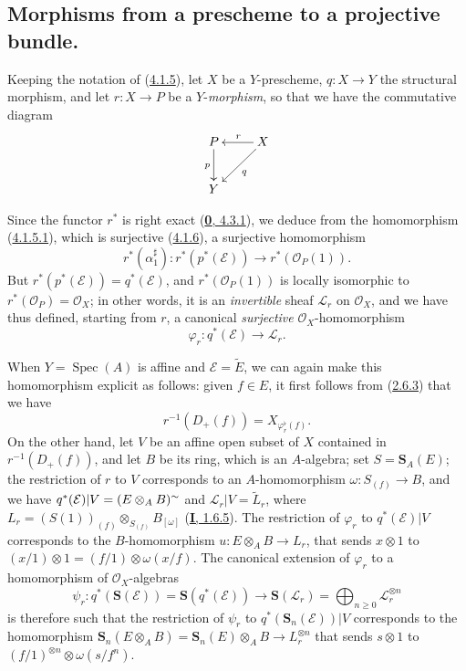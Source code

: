 \subsection{Morphisms from a prescheme to a projective bundle.}
\label{subsection:II.4.2}

\begin{env}[4.2.1]
\label{II.4.2.1}
Keeping the notation of (\hyperref[II.4.1.5]{4.1.5}), let $X$ be a
$Y$-prescheme, $q:X\to Y$ the structural morphism, and let $r:X\to P$ be a
$Y$-\emph{morphism}, so that we have the commutative diagram
\[
  \xymatrix{
    P \ar[d]_p & X \ar[l]_r \ar[dl]^q
    \\Y
  }
\]


Since the functor $r^*$ is right exact
(\hyperref[0.4.3.1]{\textbf{0}, 4.3.1}), we deduce from the homomorphism
(\hyperref[II.4.1.5.1]{4.1.5.1}), which is surjective
(\hyperref[II.4.1.6]{4.1.6}), a surjective homomorphism
\[
  r^*(\alpha_1^\sharp):r^*(p^*(\mathcal{E}))\longrightarrow
  r^*(\mathcal{O}_P(1)).
\]
But $r^*(p^*(\mathcal{E}))=q^*(\mathcal{E})$, and
$r^*(\mathcal{O}_P(1))$ is locally isomorphic to
$r^*(\mathcal{O}_P)=\mathcal{O}_X$; in other words, it is an \emph{invertible}
sheaf $\mathcal{L}_r$ on $\mathcal{O}_X$, and we have thus defined, starting
from $r$, a canonical \emph{surjective} $\mathcal{O}_X$-homomorphism
\[
\label{II.4.2.1.1}
  \varphi_r:q^*(\mathcal{E})\longrightarrow\mathcal{L}_r.
\tag{4.2.1.1}
\]

When $Y=\operatorname{Spec}(A)$ is affine and
$\mathcal{E}=\widetilde{E}$, we can again make this homomorphism explicit as
follows: given $f\in E$, it first follows from
(\hyperref[II.2.6.3]{2.6.3}) that we have
\[
\label{II.4.2.1.2}
  r^{-1}(D_+(f))=X_{\varphi_r^\flat(f)}.
\tag{4.2.1.2}
\]
On the other hand, let $V$ be an affine open subset of $X$ contained in
$r^{-1}(D_+(f))$, and let $B$ be its ring, which is an $A$-algebra; set
$S=\mathbf{S}_A(E)$; the restriction of $r$ to $V$ corresponds to an
$A$-homomorphism $\omega:S_{(f)}\to B$, and we have
$q^*(\mathcal{E})|V=(E\otimes_A B)^{\sim}$ and
$\mathcal{L}_r|V=\widetilde{L}_r$, where
$L_r=(S(1))_{(f)}\otimes_{S_{(f)}}B_{[\omega]}$
(\hyperref[I.1.6.5]{\textbf{I}, 1.6.5}). The restriction of $\varphi_r$ to
$q^*(\mathcal{E})|V$ corresponds to the $B$-homomorphism
$u:E\otimes_A B\to L_r$, that sends $x\otimes1$ to
$(x/1)\otimes1=(f/1)\otimes\omega(x/f)$. The canonical extension of
$\varphi_r$ to a homomorphism of $\mathcal{O}_X$-algebras
\[
  \psi_r:q^*(\mathbf{S}(\mathcal{E}))=
  \mathbf{S}(q^*(\mathcal{E}))\longrightarrow
  \mathbf{S}(\mathcal{L}_r)=\bigoplus_{n\geq0}\mathcal{L}_r^{\otimes n}
\]
is therefore such that the restriction of $\psi_r$ to
$q^*(\mathbf{S}_n(\mathcal{E}))|V$ corresponds to the homomorphism
$\mathbf{S}_n(E\otimes_A B)=\mathbf{S}_n(E)\otimes_A B\to L_r^{\otimes n}$
that sends $s\otimes1$ to
$(f/1)^{\otimes n}\otimes\omega(s/f^n)$.
\end{env}

